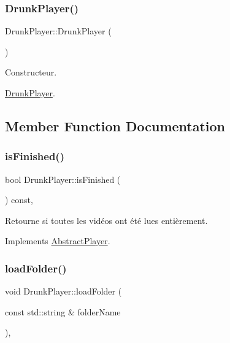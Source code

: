 \subsubsection{\texorpdfstring{Drunk\+Player()}{DrunkPlayer()}}
{\footnotesize\ttfamily Drunk\+Player\+::\+Drunk\+Player (\begin{DoxyParamCaption}{ }\end{DoxyParamCaption})}



Constructeur. 

\hyperlink{classDrunkPlayer}{Drunk\+Player}. 

\subsection{Member Function Documentation}
\mbox{\label{classDrunkPlayer_a9c032dda7df01fafc757fb1f4e265bb4}} 
\subsubsection{\texorpdfstring{is\+Finished()}{isFinished()}}
{\footnotesize\ttfamily bool Drunk\+Player\+::is\+Finished (\begin{DoxyParamCaption}{ }\end{DoxyParamCaption}) const\hspace{0.3cm}{\ttfamily [override]}, {\ttfamily [virtual]}}



Retourne si toutes les vidéos ont été lues entièrement. 



Implements \hyperlink{classAbstractPlayer_a841896a599ebe6b8317905de78c44bcc}{Abstract\+Player}.

\mbox{\label{classDrunkPlayer_a235e60ea8a97c4d26277b066c2cebe80}} 
\subsubsection{\texorpdfstring{load\+Folder()}{loadFolder()}}
{\footnotesize\ttfamily void Drunk\+Player\+::load\+Folder (\begin{DoxyParamCaption}\item[{const std\+::string \&}]{folder\+Name }\end{DoxyParamCaption})\hspace{0.3cm}{\ttfamily [override]}, {\ttfamily [virtual]}}



